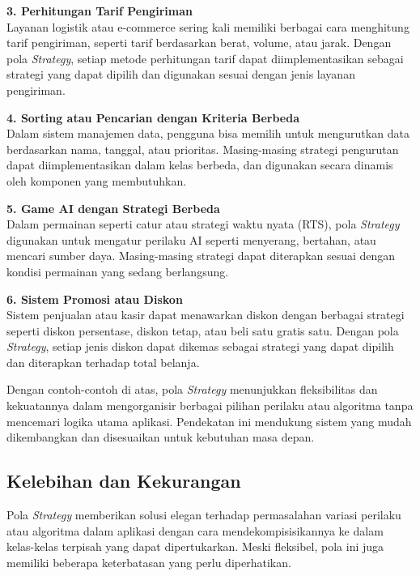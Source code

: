 \textbf{3. Perhitungan Tarif Pengiriman} \\
Layanan logistik atau e-commerce sering kali memiliki berbagai cara menghitung tarif pengiriman, seperti tarif berdasarkan berat, volume, atau jarak. Dengan pola \textit{Strategy}, setiap metode perhitungan tarif dapat diimplementasikan sebagai strategi yang dapat dipilih dan digunakan sesuai dengan jenis layanan pengiriman.

\textbf{4. Sorting atau Pencarian dengan Kriteria Berbeda} \\
Dalam sistem manajemen data, pengguna bisa memilih untuk mengurutkan data berdasarkan nama, tanggal, atau prioritas. Masing-masing strategi pengurutan dapat diimplementasikan dalam kelas berbeda, dan digunakan secara dinamis oleh komponen yang membutuhkan.

\textbf{5. Game AI dengan Strategi Berbeda} \\
Dalam permainan seperti catur atau strategi waktu nyata (RTS), pola \textit{Strategy} digunakan untuk mengatur perilaku AI seperti menyerang, bertahan, atau mencari sumber daya. Masing-masing strategi dapat diterapkan sesuai dengan kondisi permainan yang sedang berlangsung.

\textbf{6. Sistem Promosi atau Diskon} \\
Sistem penjualan atau kasir dapat menawarkan diskon dengan berbagai strategi seperti diskon persentase, diskon tetap, atau beli satu gratis satu. Dengan pola \textit{Strategy}, setiap jenis diskon dapat dikemas sebagai strategi yang dapat dipilih dan diterapkan terhadap total belanja.

Dengan contoh-contoh di atas, pola \textit{Strategy} menunjukkan fleksibilitas dan kekuatannya dalam mengorganisir berbagai pilihan perilaku atau algoritma tanpa mencemari logika utama aplikasi. Pendekatan ini mendukung sistem yang mudah dikembangkan dan disesuaikan untuk kebutuhan masa depan.

\subsection{Kelebihan dan Kekurangan}

Pola \textit{Strategy} memberikan solusi elegan terhadap permasalahan variasi perilaku atau algoritma dalam aplikasi dengan cara mendekompisisikannya ke dalam kelas-kelas terpisah yang dapat dipertukarkan. Meski fleksibel, pola ini juga memiliki beberapa keterbatasan yang perlu diperhatikan.


